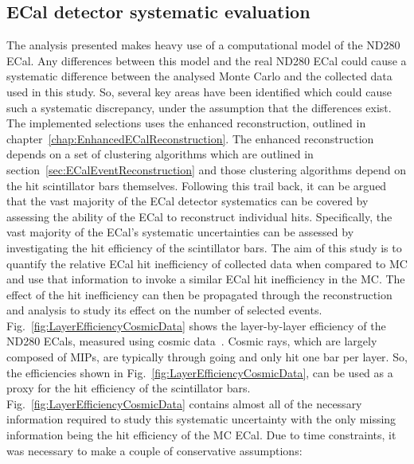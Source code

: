 \subsection{ECal detector systematic evaluation}
\label{subsec:ECalDetectorSystematic}
The analysis presented makes heavy use of a computational model of the ND280 ECal.  Any differences between this model and the real ND280 ECal could cause a systematic difference between the analysed Monte Carlo and the collected data used in this study.  So, several key areas have been identified which could cause such a systematic discrepancy, under the assumption that the differences exist.
\newline
\newline
The implemented selections uses the enhanced reconstruction, outlined in chapter~\ref{chap:EnhancedECalReconstruction}.  The enhanced reconstruction depends on a set of clustering algorithms which are outlined in section~\ref{sec:ECalEventReconstruction} and those clustering algorithms depend on the hit scintillator bars themselves.  Following this trail back, it can be argued that the vast majority of the ECal detector systematics can be covered by assessing the ability of the ECal to reconstruct individual hits.  Specifically, the vast majority of the ECal's systematic uncertainties can be assessed by investigating the hit efficiency of the scintillator bars.  
\newline
\newline
The aim of this study is to quantify the relative ECal hit inefficiency of collected data when compared to MC and use that information to invoke a similar ECal hit inefficiency in the MC.  The effect of the hit inefficiency can then be propagated through the reconstruction and analysis to study its effect on the number of selected events.  Fig.~\ref{fig:LayerEfficiencyCosmicData} shows the layer-by-layer efficiency of the ND280 ECals, measured using cosmic data~\cite{1748-0221-8-10-P10019}.  Cosmic rays, which are largely composed of MIPs, are typically through going and only hit one bar per layer.  So, the efficiencies shown in Fig.~\ref{fig:LayerEfficiencyCosmicData}, can be used as a proxy for the hit efficiency of the scintillator bars.  Fig.~\ref{fig:LayerEfficiencyCosmicData} contains almost all of the necessary information required to study this systematic uncertainty with the only missing information being the hit efficiency of the MC ECal.  Due to time constraints, it was necessary to make a couple of conservative assumptions:

